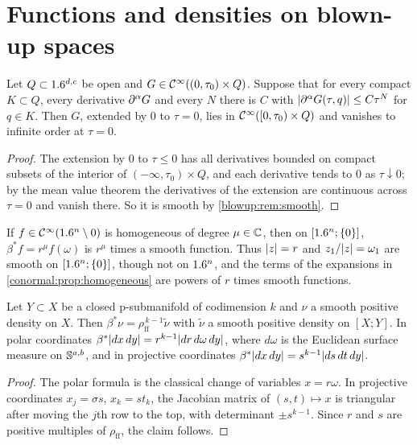 \section{Functions and densities on blown-up spaces}\label{blowup:sec:functions}

\begin{lemma}\label{blowup:lem:flat}
Let $Q\subset1.6^{d,c}$ be open and $G\in\mathcal{C}^\infty((0,\tau_0)\times Q)$. Suppose that for every
compact $K\subset Q$, every derivative $\partial^\alpha G$ and every $N$ there is $C$ with
$\lvert \partial^\alpha G(\tau,q)\rvert\le C\tau^N$ for $q\in K$. Then $G$, extended by $0$ to
$\tau=0$, lies in $\mathcal{C}^\infty([0,\tau_0)\times Q)$ and vanishes to infinite order at
$\tau=0$.
\end{lemma}
\begin{proof}
The extension by $0$ to $\tau\le0$ has all derivatives bounded on compact subsets of the
interior of $(-\infty,\tau_0)\times Q$, and each derivative tends to $0$ as $\tau\downarrow0$;
by the mean value theorem the derivatives of the extension are continuous across
$\tau=0$ and vanish there. So it is smooth by \cref{blowup:rem:smooth}.
\end{proof}

\begin{example}\label{blowup:exa:homogeneous}
If $f\in\mathcal{C}^\infty(1.6^n\setminus0)$ is homogeneous of degree $\mu\in\mathbb{C}$, then on $[1.6^n;\{0\}]$,
$\beta^*f=r^\mu f(\omega)$ is $r^\mu$ times a smooth function. Thus $\lvert z\rvert=r$ and
$z_1/\lvert z\rvert=\omega_1$ are smooth on $[1.6^n;\{0\}]$, though not on $1.6^n$, and the terms of
the expansions in \cref{conormal:prop:homogeneous} are powers of $r$ times smooth
functions.
\end{example}

\begin{proposition}\label{blowup:prop:density}
Let $Y\subset X$ be a closed p-submanifold of codimension $k$ and $\nu$ a smooth positive
density on $X$. Then $\beta^*\nu=\rho_{\mathrm{ff}}^{\,k-1}\tilde\nu$ with $\tilde\nu$ a smooth
positive density on $[X;Y]$. In polar coordinates $\beta^*\lvert dx\,dy\rvert=r^{k-1}\lvert dr\,d\omega\,dy\rvert$,
where $d\omega$ is the Euclidean surface measure on $\mathbb{S}^{a,b}$, and in projective
coordinates $\beta^*\lvert dx\,dy\rvert=s^{k-1}\lvert ds\,dt\,dy\rvert$.
\end{proposition}
\begin{proof}
The polar formula is the classical change of variables $x=r\omega$. In projective
coordinates $x_j=\sigma s$, $x_k=st_k$, the Jacobian matrix of $(s,t)\mapsto x$ is
triangular after moving the $j$th row to the top, with determinant $\pm s^{k-1}$. Since
$r$ and $s$ are positive multiples of $\rho_{\mathrm{ff}}$, the claim follows.
\end{proof}

